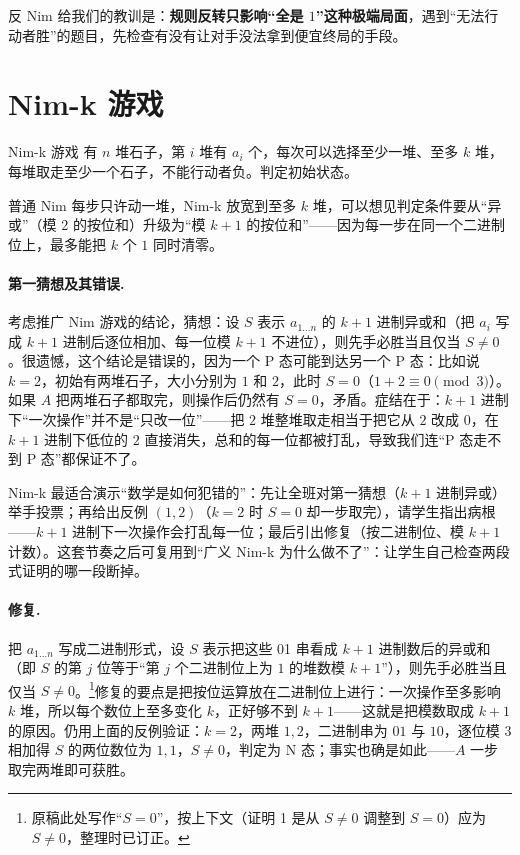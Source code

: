 反 Nim 给我们的教训是：\textbf{规则反转只影响“全是 $1$”这种极端局面}，遇到“无法行动者胜”的题目，先检查有没有让对手没法拿到便宜终局的手段。

\section{Nim-k 游戏}
\begin{problem}{Nim-k 游戏}
有 $n$ 堆石子，第 $i$ 堆有 $a_i$ 个，每次可以选择至少一堆、至多 $k$ 堆，每堆取走至少一个石子，不能行动者负。判定初始状态。
\end{problem}

普通 Nim 每步只许动一堆，Nim-k 放宽到至多 $k$ 堆，可以想见判定条件要从“异或”（模 $2$ 的按位和）升级为“模 $k+1$ 的按位和”——因为每一步在同一个二进制位上，最多能把 $k$ 个 $1$ 同时清零。

\paragraph{第一猜想及其错误.} 考虑推广 Nim 游戏的结论，猜想：设 $S$ 表示 $a_{1\ldots n}$ 的 $k+1$ 进制异或和（把 $a_i$ 写成 $k+1$ 进制后逐位相加、每一位模 $k+1$ 不进位），则先手必胜当且仅当 $S\ne0$。很遗憾，这个结论是错误的，因为一个 P 态可能到达另一个 P 态：比如说 $k=2$，初始有两堆石子，大小分别为 $1$ 和 $2$，此时 $S=0$（$1+2\equiv0\pmod 3$）。如果 $A$ 把两堆石子都取完，则操作后仍然有 $S=0$，矛盾。症结在于：$k+1$ 进制下“一次操作”并不是“只改一位”——把 $2$ 堆整堆取走相当于把它从 $2$ 改成 $0$，在 $k+1$ 进制下低位的 $2$ 直接消失，总和的每一位都被打乱，导致我们连“P 态走不到 P 态”都保证不了。

\begin{teach}[猜想--反驳--修复的教学节奏]
Nim-k 最适合演示“数学是如何犯错的”：先让全班对第一猜想（$k+1$ 进制异或）举手投票；再给出反例 $(1,2)$（$k=2$ 时 $S=0$ 却一步取完），请学生指出病根——$k+1$ 进制下一次操作会打乱每一位；最后引出修复（按二进制位、模 $k+1$ 计数）。这套节奏之后可复用到“广义 Nim-k 为什么做不了”：让学生自己检查两段式证明的哪一段断掉。
\end{teach}
\paragraph{修复.} 把 $a_{1\ldots n}$ 写成二进制形式，设 $S$ 表示把这些 01 串看成 $k+1$ 进制数后的异或和（即 $S$ 的第 $j$ 位等于“第 $j$ 个二进制位上为 $1$ 的堆数模 $k+1$”），则先手必胜当且仅当 $S\ne0$。\footnote{原稿此处写作“$S=0$”，按上下文（证明 1 是从 $S\ne0$ 调整到 $S=0$）应为 $S\ne0$，整理时已订正。}修复的要点是把按位运算放在二进制位上进行：一次操作至多影响 $k$ 堆，所以每个数位上至多变化 $k$，正好够不到 $k+1$——这就是把模数取成 $k+1$ 的原因。仍用上面的反例验证：$k=2$，两堆 $1,2$，二进制串为 $01$ 与 $10$，逐位模 $3$ 相加得 $S$ 的两位数位为 $1,1$，$S\ne0$，判定为 N 态；事实也确是如此——$A$ 一步取完两堆即可获胜。

